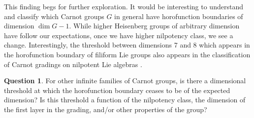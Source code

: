 \documentclass{article}
\theoremstyle{definition}
\newtheorem{question}[theorem]{Question}
\begin{document}
This finding begs for further exploration. It would be interesting to understand and classify which Carnot groups $G$ in general have horofunction boundaries of dimension $\dim G -1$. While higher Heisenberg groups of arbitrary dimension have follow our expectations, once we have higher nilpotency class, we see a change. Interestingly, the threshold between dimensions 7 and 8 which appears in the horofunction boundary of filiform Lie groups also appears in the classification of Carnot gradings on nilpotent Lie algebras \cite{cornulier-gradings}.

\begin{question}
For other infinite families of Carnot groups, is there a dimensional threshold at which the horofunction boundary ceases to be of the expected dimension? Is this threshold a function of the nilpotency class, the dimension of the first layer in the grading, and/or other properties of the group?
\end{question}



\end{document}
